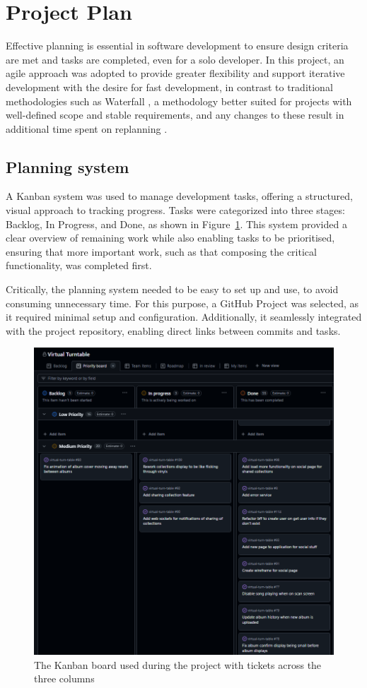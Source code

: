 \section{Project Plan}
Effective planning is essential in software development to ensure design criteria are met and tasks are completed, even for a solo developer. In this project, an agile approach was adopted to provide greater flexibility and support iterative development with the desire for fast development, in contrast to traditional methodologies such as Waterfall \cite{5222784}, a methodology better suited for projects with well-defined scope and stable requirements, and any changes to these result in additional time spent on replanning \cite{andrei2019study}.


\subsection{Planning system} \label{sec:plan-system}
A Kanban system was used to manage development tasks, offering a structured, visual approach to tracking progress. Tasks were categorized into three stages: Backlog, In Progress, and Done, as shown in Figure~\ref{fig:kanban-board}. This system provided a clear overview of remaining work while also enabling tasks to be prioritised, ensuring that more important work, such as that composing the critical functionality, was completed first.

Critically, the planning system needed to be easy to set up and use, to avoid consuming unnecessary time. For this purpose, a GitHub Project was selected, as it required minimal setup and configuration. Additionally, it seamlessly integrated with the project repository, enabling direct links between commits and tasks.

\begin{figure}
    \centering
    \includegraphics[width=0.65\linewidth]{figures/kanban_board.png}
    \captionsetup{justification=centering,margin=2cm}
    \caption{The Kanban board used during the project with tickets across the three columns}
    \label{fig:kanban-board}
\end{figure}

